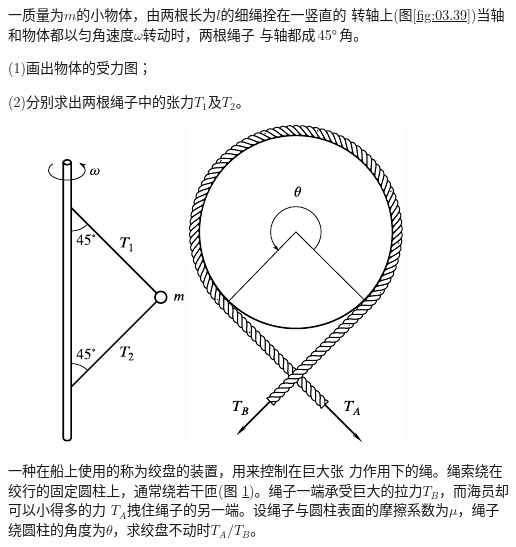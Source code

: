 \begin{exercises}
\exercise 一质量为$ m $的小物体，由两根长为$ l $的细绳拴在一竖直的
转轴上(图\ref{fig:03.39})当轴和物体都以匀角速度$ \omega $转动时，两根绳子
与轴都成\,\ang{45}\,角。

(1)画出物体的受力图；

(2)分别求出两根绳子中的张力$ T_1 $及$ T_2 $。

\begin{figure}[h]
  \begin{minipage}[b]{0.5\linewidth}
    \centering
    \includegraphics{figure/fig03.39}
    \caption{}
    \label{fig:03.39}
  \end{minipage}
  \begin{minipage}[b]{0.5\linewidth}
    \centering
    \includegraphics{figure/fig03.40}
    \caption{}
    \label{fig:03.40}
  \end{minipage}
  \vspace{-1.56em}
\end{figure}

\exercise 一种在船上使用的称为绞盘的装置，用来控制在巨大张
力作用下的绳。绳索绕在绞行的固定圆柱上，通常绕若干匝(图
\ref{fig:03.40})。绳子一端承受巨大的拉力$ T _ { B } $，而海员却可以小得多的力
$ T_A $拽住绳子的另一端。设绳子与圆柱表面的摩擦系数为$ \mu $，绳子
绕圆柱的角度为$ \theta $，求绞盘不动时$ T_A / T_B $。


\end{exercises}

